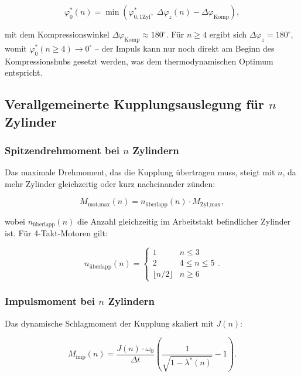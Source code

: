 ﻿\documentclass[a4paper,12pt]{article}
\begin{document}
\begin{equation}
  \varphi_0^*(n) = \min\!\left(\varphi_{0,\text{1Zyl}}^*,\;
    \Delta\varphi_z(n) - \Delta\varphi_\text{Komp}\right),
  \label{eq:phi0_n}
\end{equation}

\noindent
mit dem Kompressionswinkel $\Delta\varphi_\text{Komp} \approx 180^\circ$.
Für $n \geq 4$ ergibt sich $\Delta\varphi_z = 180^\circ$, womit
$\varphi_0^*(n \geq 4) \to 0^\circ$ -- der Impuls kann nur noch
direkt am Beginn des Kompressionshubs gesetzt werden, was dem
thermodynamischen Optimum entspricht.

\subsection{Verallgemeinerte Kupplungsauslegung für $n$ Zylinder}

\subsubsection*{Spitzendrehmoment bei $n$ Zylindern}

Das maximale Drehmoment, das die Kupplung übertragen muss, steigt
mit $n$, da mehr Zylinder gleichzeitig oder kurz nacheinander zünden:

\begin{equation}
  M_\text{mot,max}(n) = n_\text{überlapp}(n) \cdot M_\text{Zyl,max},
  \label{eq:M_max_n}
\end{equation}

\noindent
wobei $n_\text{überlapp}(n)$ die Anzahl gleichzeitig im Arbeitstakt
befindlicher Zylinder ist. Für 4-Takt-Motoren gilt:

\begin{equation}
  n_\text{überlapp}(n) =
  \begin{cases}
    1   & n \leq 3 \\
    2   & 4 \leq n \leq 5 \\
    \lfloor n/2 \rfloor & n \geq 6
  \end{cases}.
  \label{eq:n_overlap}
\end{equation}

\subsubsection*{Impulsmoment bei $n$ Zylindern}

Das dynamische Schlagmoment der Kupplung skaliert mit $J(n)$:

\begin{equation}
  M_\text{imp}(n) = \frac{J(n) \cdot \omega_0}{\Delta t}
    \left(\frac{1}{\sqrt{1 - \lambda^*(n)}} - 1\right).
  \label{eq:M_imp_n}
\end{equation}
\end{document}

